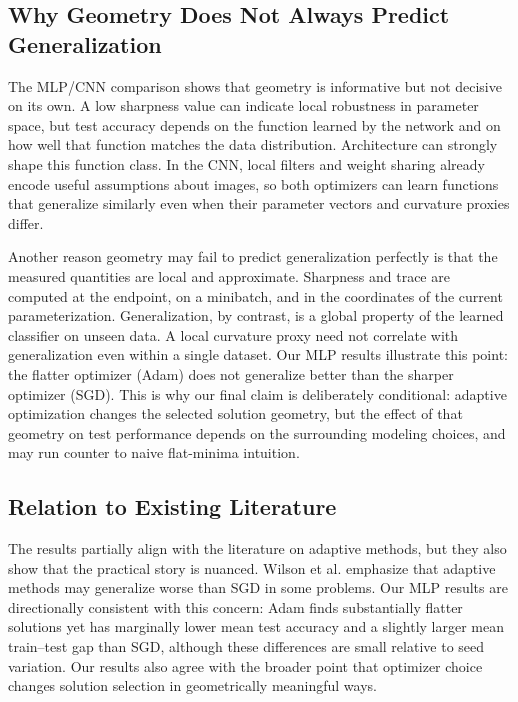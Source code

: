 \documentclass[11pt]{article}
\begin{document}
\subsection{Why Geometry Does Not Always Predict Generalization}

The MLP/CNN comparison shows that geometry is informative but not decisive on its own. A low sharpness value can indicate local robustness in parameter space, but test accuracy depends on the function learned by the network and on how well that function matches the data distribution. Architecture can strongly shape this function class. In the CNN, local filters and weight sharing already encode useful assumptions about images, so both optimizers can learn functions that generalize similarly even when their parameter vectors and curvature proxies differ.

Another reason geometry may fail to predict generalization perfectly is that the measured quantities are local and approximate. Sharpness and trace are computed at the endpoint, on a minibatch, and in the coordinates of the current parameterization. Generalization, by contrast, is a global property of the learned classifier on unseen data. A local curvature proxy need not correlate with generalization even within a single dataset. Our MLP results illustrate this point: the flatter optimizer (Adam) does not generalize better than the sharper optimizer (SGD). This is why our final claim is deliberately conditional: adaptive optimization changes the selected solution geometry, but the effect of that geometry on test performance depends on the surrounding modeling choices, and may run counter to naive flat-minima intuition.

\subsection{Relation to Existing Literature}

The results partially align with the literature on adaptive methods, but they also show that the practical story is nuanced. Wilson et al. \cite{wilson2017marginal} emphasize that adaptive methods may generalize worse than SGD in some problems. Our MLP results are directionally consistent with this concern: Adam finds substantially flatter solutions yet has marginally lower mean test accuracy and a slightly larger mean train--test gap than SGD, although these differences are small relative to seed variation. Our results also agree with the broader point that optimizer choice changes solution selection in geometrically meaningful ways.
\end{document}
